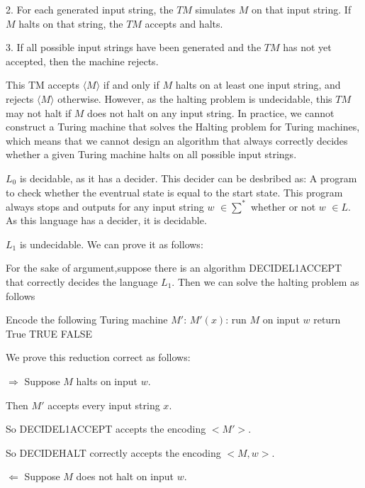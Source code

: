 \documentclass[12pt,a4paper]{article}
\newcommand{\question}[1]{\bigskip\noindent{\textbf{Q{#1} solution}}}
\begin{document}
2. For each generated input string, the $TM$ simulates $M$ on that input string. If $M$ halts on that string, the $TM$ accepts and halts.

3. If all possible input strings have been generated and the $TM$ has not yet accepted, then the machine rejects.

This TM accepts $⟨M⟩$ if and only if $M$ halts on at least one input string, and rejects $⟨M⟩$ otherwise. However, as the halting problem is undecidable, this $TM$ may not halt if $M$ does not halt on any input string. In practice, we cannot construct a Turing machine that solves the Halting problem for Turing machines, which means that we cannot design an algorithm that always correctly decides whether a given Turing machine halts on all possible input strings.

\question{37.A}

$L_0$ is decidable, as it has a decider. This decider can be desbribed as: A program to check whether the eventrual state is equal to the start state.
This program always stops and outputs for any input string $w$ $\in \sum^*$ whether or not $w$ $\in L$.
As this language has a decider, it is decidable.

\question{37.B}

$L_1$ is undecidable. We can prove it as follows:

For the sake of argument,suppose there is an algorithm DECIDEL1ACCEPT that correctly decides the language $L_1$. Then we can solve the halting problem as follows
\begin{algorithm}
	\begin{algorithmic}
		\State Encode the following Turing machine $M'$:
		\State\quad $M'(x)$:
			\State\quad\quad run $M$ on input $w$
			\State\quad\quad return True
		\State \Return TRUE
		\Else{}
		\State \Return FALSE 
		\EndIf
		\EndFunction
	\end{algorithmic}
\end{algorithm}

We prove this reduction correct as follows:

$\Longrightarrow$ Suppose $M$ halts on input $w$.
     
	  Then $M'$ accepts every input string $x$.

	  So DECIDEL1ACCEPT accepts the encoding $<M'>$.

	  So DECIDEHALT correctly accepts the encoding $<M,w>$.


$\Longleftarrow$ Suppose $M$ does not halt on input $w$.
\end{document}
